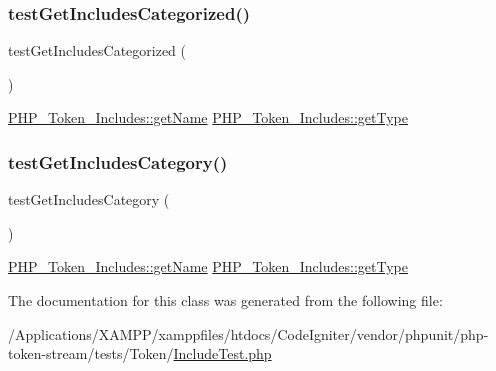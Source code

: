 \subsubsection{\texorpdfstring{test\+Get\+Includes\+Categorized()}{testGetIncludesCategorized()}}
{\footnotesize\ttfamily test\+Get\+Includes\+Categorized (\begin{DoxyParamCaption}{ }\end{DoxyParamCaption})}

\mbox{\hyperlink{class_p_h_p___token___includes_a3d0963e68bb313b163a73f2803c64600}{P\+H\+P\+\_\+\+Token\+\_\+\+Includes\+::get\+Name}}  \mbox{\hyperlink{class_p_h_p___token___includes_a830b5c75df72b32396701bc563fbe3c7}{P\+H\+P\+\_\+\+Token\+\_\+\+Includes\+::get\+Type}} \mbox{\label{class_p_h_p___token___include_test_acb5ed0ed19720fc0cf6f4880f6250276}} 
\subsubsection{\texorpdfstring{test\+Get\+Includes\+Category()}{testGetIncludesCategory()}}
{\footnotesize\ttfamily test\+Get\+Includes\+Category (\begin{DoxyParamCaption}{ }\end{DoxyParamCaption})}

\mbox{\hyperlink{class_p_h_p___token___includes_a3d0963e68bb313b163a73f2803c64600}{P\+H\+P\+\_\+\+Token\+\_\+\+Includes\+::get\+Name}}  \mbox{\hyperlink{class_p_h_p___token___includes_a830b5c75df72b32396701bc563fbe3c7}{P\+H\+P\+\_\+\+Token\+\_\+\+Includes\+::get\+Type}} 

The documentation for this class was generated from the following file\+:\begin{DoxyCompactItemize}
\item 
/\+Applications/\+X\+A\+M\+P\+P/xamppfiles/htdocs/\+Code\+Igniter/vendor/phpunit/php-\/token-\/stream/tests/\+Token/\mbox{\hyperlink{_include_test_8php}{Include\+Test.\+php}}\end{DoxyCompactItemize}

